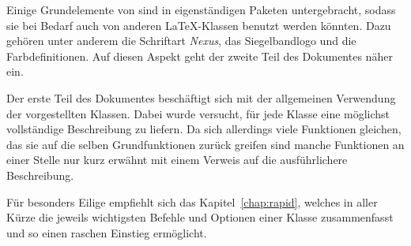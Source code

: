 Einige Grundelemente von \tubslatex sind in eigenständigen Paketen untergebracht, sodass sie bei Bedarf auch von anderen \LaTeX-Klassen benutzt werden könnten. Dazu gehören unter anderem die Schriftart \emph{Nexus}, das Siegelbandlogo und die Farbdefinitionen.
Auf diesen Aspekt geht der zweite Teil des Dokumentes näher ein.%

Der erste Teil des Dokumentes beschäftigt sich mit der allgemeinen Verwendung
der vorgestellten Klassen.
Dabei wurde versucht, für jede Klasse eine möglichst vollständige Beschreibung
zu liefern. Da sich allerdings viele Funktionen gleichen, das sie auf die selben
Grundfunktionen zurück greifen sind manche Funktionen an einer Stelle nur kurz erwähnt mit einem Verweis auf die ausführlichere Beschreibung.

Für besonders Eilige empfiehlt sich das Kapitel~\ref{chap:rapid}, welches in aller Kürze die jeweils wichtigsten Befehle und Optionen einer Klasse zusammenfasst und so einen raschen Einstieg ermöglicht.
